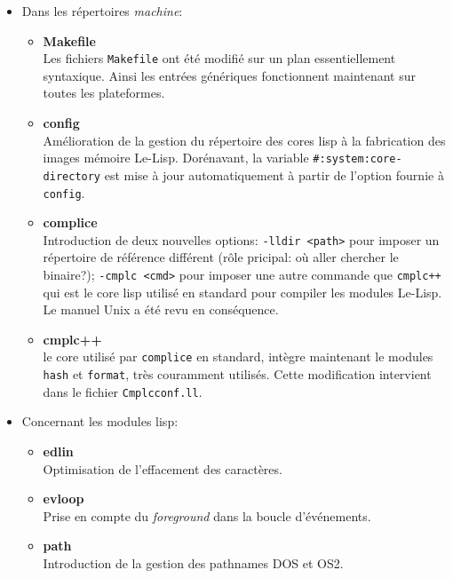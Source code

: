 \begin {itemize}

\item Dans les r\'{e}pertoires {\it machine}:
\begin {itemize}
\item {\bf Makefile}\\
Les fichiers {\tt Makefile} ont \'{e}t\'{e} modifi\'{e} sur un plan
essentiellement syntaxique. Ainsi les entr\'{e}es g\'{e}n\'{e}riques
fonctionnent maintenant sur toutes les plateformes.

\item {\bf config}\\
Am\'{e}lioration de la gestion du r\'{e}pertoire des cores lisp \`{a} la
fabrication des images m\'{e}moire Le-Lisp.
Dor\'{e}navant, la variable {\tt \#:system:core-directory} est mise
\`{a} jour automatiquement \`{a} partir de l'option fournie \`{a} {\tt config}.

\item {\bf complice}\\
Introduction de deux nouvelles options: {\tt -lldir <path>} pour
imposer un r\'{e}pertoire de r\'{e}f\'{e}rence diff\'{e}rent (r\^{o}le pricipal: o\`{u}
aller chercher le binaire?); {\tt -cmplc <cmd>}
pour imposer une autre commande que {\tt cmplc++} qui est le core lisp
utilis\'{e} en standard pour compiler les modules Le-Lisp. Le manuel Unix
a \'{e}t\'{e} revu en cons\'{e}quence. 

\item {\bf cmplc++}\\
le core utilis\'{e} par {\tt complice} en standard, int\`{e}gre maintenant
le modules {\tt hash} et {\tt format}, tr\`{e}s couramment utilis\'{e}s.
Cette modification intervient dans le fichier {\tt Cmplcconf.ll}.
\end{itemize}

\item Concernant les modules lisp:
\begin{itemize}
\item {\bf edlin}\\
Optimisation de l'effacement des caract\`{e}res.

\item {\bf evloop}\\
Prise en compte du {\it foreground} dans la boucle d'\'{e}v\'{e}nements.

\item {\bf path}\\
Introduction de la gestion des pathnames DOS et OS2.


\end{itemize}
\end{itemize}
